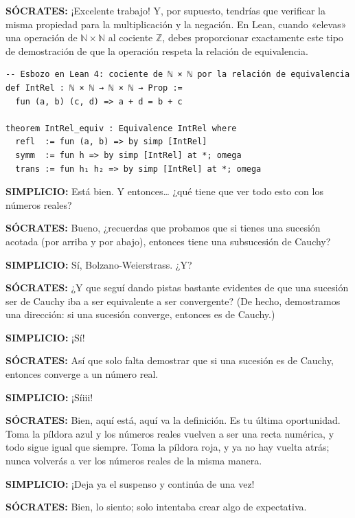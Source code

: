 \medskip
\noindent\textbf{SÓCRATES:} ¡Excelente trabajo! Y, por supuesto, tendrías que verificar la misma propiedad para la multiplicación y la negación. En Lean, cuando «elevas» una operación de $\mathbb{N} \times \mathbb{N}$ al cociente $\mathbb{Z}$, debes proporcionar exactamente este tipo de demostración de que la operación respeta la relación de equivalencia.

\begin{verbatim}
-- Esbozo en Lean 4: cociente de ℕ × ℕ por la relación de equivalencia
def IntRel : ℕ × ℕ → ℕ × ℕ → Prop :=
  fun (a, b) (c, d) => a + d = b + c

theorem IntRel_equiv : Equivalence IntRel where
  refl  := fun (a, b) => by simp [IntRel]
  symm  := fun h => by simp [IntRel] at *; omega
  trans := fun h₁ h₂ => by simp [IntRel] at *; omega
\end{verbatim}

\medskip
\noindent\textbf{SIMPLICIO:} Está bien. Y entonces\ldots{} ¿qué tiene que ver todo esto con los números reales?

\medskip
\noindent\textbf{SÓCRATES:} Bueno, ¿recuerdas que probamos que si tienes una sucesión acotada (por arriba y por abajo), entonces tiene una subsucesión de Cauchy?

\medskip
\noindent\textbf{SIMPLICIO:} Sí, Bolzano-Weierstrass. ¿Y?

\medskip
\noindent\textbf{SÓCRATES:} ¿Y que seguí dando pistas bastante evidentes de que una sucesión ser de Cauchy iba a ser equivalente a ser convergente? (De hecho, demostramos una dirección: si una sucesión converge, entonces es de Cauchy.)

\medskip
\noindent\textbf{SIMPLICIO:} ¡Sí!

\medskip
\noindent\textbf{SÓCRATES:} Así que solo falta demostrar que si una sucesión es de Cauchy, entonces converge a un número real.

\medskip
\noindent\textbf{SIMPLICIO:} ¡Síiii!

\medskip
\noindent\textbf{SÓCRATES:} Bien, aquí está, aquí va la definición. Es tu última oportunidad. Toma la píldora azul y los números reales vuelven a ser una recta numérica, y todo sigue igual que siempre. Toma la píldora roja, y ya no hay vuelta atrás; nunca volverás a ver los números reales de la misma manera.

\medskip
\noindent\textbf{SIMPLICIO:} ¡Deja ya el suspenso y continúa de una vez!

\medskip
\noindent\textbf{SÓCRATES:} Bien, lo siento; solo intentaba crear algo de expectativa.

